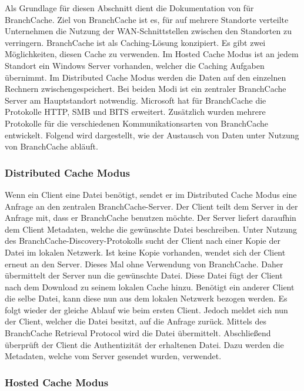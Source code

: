 Als Grundlage für diesen Abschnitt dient die Dokumentation von \textcite{microsoftBranchCache} für BranchCache. Ziel von BranchCache ist es, für auf mehrere Standorte verteilte Unternehmen die Nutzung der WAN-Schnittstellen zwischen den Standorten zu verringern. BranchCache ist als Caching-Lösung konzipiert. Es gibt zwei Möglichkeiten, diesen Cache zu verwenden. Im Hosted Cache Modus ist an jedem Standort ein Windows Server vorhanden, welcher die Caching Aufgaben übernimmt. Im Distributed Cache Modus werden die Daten auf den einzelnen Rechnern zwischengespeichert. Bei beiden Modi ist ein zentraler BranchCache Server am Hauptstandort notwendig. Microsoft hat für BranchCache die Protokolle HTTP, SMB und BITS erweitert. Zusätzlich wurden mehrere Protokolle für die verschiedenen Kommunikationsarten von BranchCache entwickelt. Folgend wird dargestellt, wie der Austausch von Daten unter Nutzung von BranchCache abläuft. 

\subsubsection{Distributed Cache Modus}

Wenn ein Client eine Datei benötigt, sendet er im Distributed Cache Modus eine Anfrage an den zentralen Branch\-Cache-Server. Der Client teilt dem Server  in der Anfrage mit, dass er BranchCache benutzen möchte. Der Server liefert daraufhin dem Client Metadaten, welche die gewünschte Datei beschreiben. Unter Nutzung des BranchCache-Discovery-Protokolls sucht der Client nach einer Kopie der Datei im lokalen Netzwerk. Ist keine Kopie vorhanden, wendet sich der Client erneut an den Server. Dieses Mal ohne Verwendung von BranchCache. Daher übermittelt der Server nun die gewünschte Datei. Diese Datei fügt der Client nach dem Download zu seinem lokalen Cache hinzu. Benötigt ein anderer Client  die selbe Datei, kann diese nun aus dem lokalen Netzwerk bezogen werden. Es folgt wieder der gleiche Ablauf wie beim ersten Client. Jedoch meldet sich nun der Client, welcher die Datei besitzt, auf die Anfrage zurück. Mittels des BranchCache Retrieval Protocol wird die Datei übermittelt. Abschließend überprüft der Client die Authentizität der erhaltenen Datei. Dazu werden die Metadaten, welche vom Server gesendet wurden, verwendet.

\subsubsection{Hosted Cache Modus}


